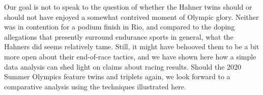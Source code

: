 \documentclass[12pt,titlepage]{article}
\begin{document}
Our goal is not to speak to the question of whether the Hahner twins
should or should not have enjoyed a somewhat contrived moment of
Olympic glory. Neither was in contention for a podium finish in Rio,
and compared to the doping allegations that presently surround
endurance sports in general, what the Hahners did seems relatively
tame. Still, it might have behooved them to be a bit more open about
their end-of-race tactics, and we have shown here how a simple data
analysis can shed light on claims about racing results.  Should the
2020 Summer Olympics feature twins and triplets again, we look forward
to a comparative analysis using the techniques illustrated here.




\end{document}
